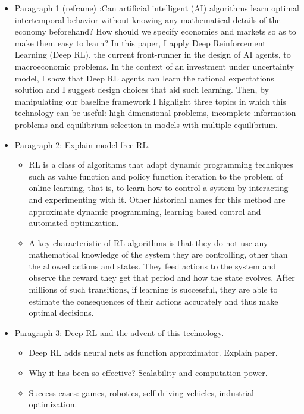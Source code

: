 \documentclass[11pt,english]{article}
\begin{document}
\begin{itemize}
	\item Paragraph 1 (reframe) :Can artificial intelligent (AI) algorithms learn optimal intertemporal behavior without knowing any mathematical details of the economy beforehand?  How should we specify economies and markets so as to make them easy to learn? In this paper, I apply Deep Reinforcement Learning (Deep RL), the current front-runner in the design of AI agents, to macroeconomic problems. In the context of an investment under uncertainty model, I show that Deep RL agents can learn the rational expectations solution and I suggest design choices that aid such learning. Then, by manipulating our baseline framework I highlight three topics in which this technology can be useful: high dimensional problems, incomplete information problems and equilibrium selection in models with multiple equilibrium.\medskip
	
	\item Paragraph 2: Explain model free RL. \medskip 
	
	\begin{itemize}
		\item RL is a class of algorithms that adapt dynamic programming techniques such as value function and policy function iteration to the problem of online learning, that is, to learn how to control a system by interacting and experimenting with it. Other historical names for this method are approximate dynamic programming, learning based control and automated optimization.  \medskip
		\item A key characteristic of RL algorithms is that they do not use any mathematical knowledge of  the system they are controlling, other than the allowed actions and states. They feed actions to the system and observe the reward they get that period and how the state evolves. After millions of such transitions, if learning is successful, they are able to estimate the consequences of their actions accurately and thus make optimal decisions. \medskip
	\end{itemize}

	\item Paragraph 3: Deep RL and the advent of this technology. \medskip 
	
			\begin{itemize}
			\item Deep RL adds neural nets as function approximator. Explain \citet{mnih2013} paper. \medskip
			\item Why it has been so effective? Scalability and computation power. \medskip
			\item Success cases: games, robotics, self-driving vehicles, industrial optimization. 
		\end{itemize}


\end{itemize}
\end{document}

